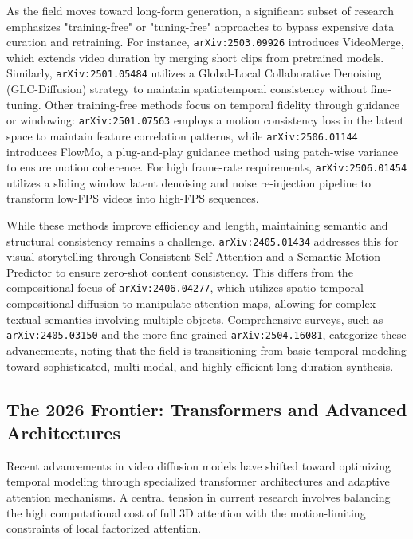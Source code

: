 \documentclass[11pt]{article}
\begin{document}
As the field moves toward long-form generation, a significant subset of research emphasizes "training-free" or "tuning-free" approaches to bypass expensive data curation and retraining. For instance, \texttt{arXiv:2503.09926} introduces VideoMerge, which extends video duration by merging short clips from pretrained models. Similarly, \texttt{arXiv:2501.05484} utilizes a Global-Local Collaborative Denoising (GLC-Diffusion) strategy to maintain spatiotemporal consistency without fine-tuning. Other training-free methods focus on temporal fidelity through guidance or windowing: \texttt{arXiv:2501.07563} employs a motion consistency loss in the latent space to maintain feature correlation patterns, while \texttt{arXiv:2506.01144} introduces FlowMo, a plug-and-play guidance method using patch-wise variance to ensure motion coherence. For high frame-rate requirements, \texttt{arXiv:2506.01454} utilizes a sliding window latent denoising and noise re-injection pipeline to transform low-FPS videos into high-FPS sequences.

While these methods improve efficiency and length, maintaining semantic and structural consistency remains a challenge. \texttt{arXiv:2405.01434} addresses this for visual storytelling through Consistent Self-Attention and a Semantic Motion Predictor to ensure zero-shot content consistency. This differs from the compositional focus of \texttt{arXiv:2406.04277}, which utilizes spatio-temporal compositional diffusion to manipulate attention maps, allowing for complex textual semantics involving multiple objects. Comprehensive surveys, such as \texttt{arXiv:2405.03150} and the more fine-grained \texttt{arXiv:2504.16081}, categorize these advancements, noting that the field is transitioning from basic temporal modeling toward sophisticated, multi-modal, and highly efficient long-duration synthesis.

\subsection{The 2026 Frontier: Transformers and Advanced Architectures}

Recent advancements in video diffusion models have shifted toward optimizing temporal modeling through specialized transformer architectures and adaptive attention mechanisms. A central tension in current research involves balancing the high computational cost of full 3D attention with the motion-limiting constraints of local factorized attention.
\end{document}
